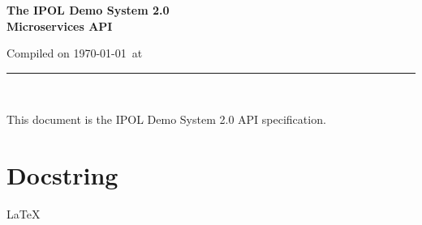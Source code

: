 \documentclass[a4paper,12pt]{article}
\begin{document}
\begin{titlepage}

\begin{center}
\vspace*{-1in}

\vspace*{0.6in}
\begin{Large}
\textbf{The IPOL Demo System 2.0 \\Microservices API} \\
\end{Large}

\vspace*{0.6in}

\small{Compiled on \today\ at \currenttime}

\vspace*{0.6in}
\rule{80mm}{0.1mm}\\
\vspace*{0.1in}
\end{center}

\end{titlepage}

This document is the IPOL Demo System 2.0 API specification.

\newpage

\tableofcontents
\newpage

\section{Docstring}
\label{sec:Docstring}
\LaTeX


\end{document}
